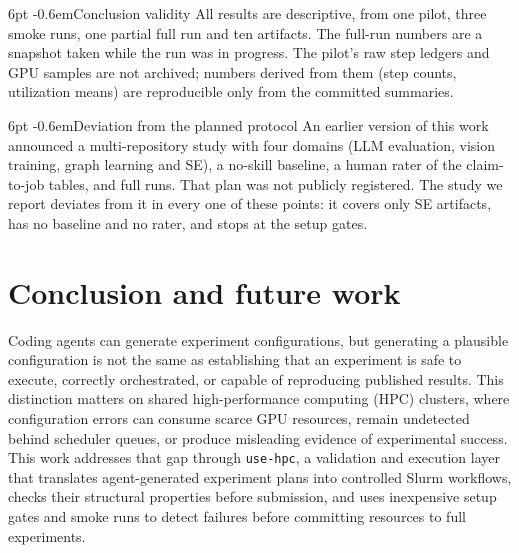 \documentclass[pdflatex,sn-mathphys-num]{sn-jnl}
\makeatletter
\theoremstyle{thmstyletwo}%
\theoremstyle{thmstylethree}%
\newcommand{\tool}{\texttt{use-hpc}}
\renewcommand\paragraph{\@startsection{paragraph}{4}{\z@}%
  {6pt \@plus 2pt \@minus 1pt}{-0.6em}{\normalfont\normalsize\bfseries}}
\makeatother
\begin{document}
\paragraph{Conclusion validity} All results are descriptive, from one pilot, three smoke runs, one partial full run and ten artifacts. The full-run numbers are a snapshot taken while the run was in progress. The pilot's raw step ledgers and GPU samples are not archived; numbers derived from them (step counts, utilization means) are reproducible only from the committed summaries.

\paragraph{Deviation from the planned protocol} An earlier version of this work announced a multi-repository study with four domains (LLM evaluation, vision training, graph learning and SE), a no-skill baseline, a human rater of the claim-to-job tables, and full runs. That plan was not publicly registered. The study we report deviates from it in every one of these points: it covers only SE artifacts, has no baseline and no rater, and stops at the setup gates.

\section{Conclusion and future work}\label{sec:concl}

Coding agents can generate experiment configurations, but generating a plausible configuration is not the same as establishing that an experiment is safe to execute, correctly orchestrated, or capable of reproducing published results. This distinction matters on shared high-performance computing (HPC) clusters, where configuration errors can consume scarce GPU resources, remain undetected behind scheduler queues, or produce misleading evidence of experimental success. This work addresses that gap through \tool{}, a validation and execution layer that translates agent-generated experiment plans into controlled Slurm workflows, checks their structural properties before submission, and uses inexpensive setup gates and smoke runs to detect failures before committing resources to full experiments.
\end{document}
